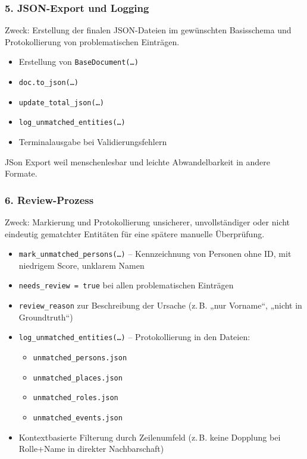 \documentclass[12pt, a4paper, ngerman, bidi=default]{article}
\begin{document}
\subsubsection*{5. JSON-Export und Logging}
Zweck: Erstellung der finalen JSON-Dateien im gewünschten Basisschema und Protokollierung von problematischen Einträgen.
\begin{itemize}
\item Erstellung von \texttt{BaseDocument(\dots)}
\item \texttt{doc.to\_json(\dots)}
\item \texttt{update\_total\_json(\dots)}
\item \texttt{log\_unmatched\_entities(\dots)}
\item Terminalausgabe bei Validierungsfehlern
\end{itemize}

JSon Export weil menschenlesbar und leichte Abwandelbarkeit in andere Formate.

\subsubsection*{6. Review-Prozess}
Zweck: Markierung und Protokollierung unsicherer, unvollständiger oder nicht eindeutig gematchter Entitäten für eine spätere manuelle Überprüfung.

\begin{itemize}
\item \texttt{mark\_unmatched\_persons(\dots)} – Kennzeichnung von Personen ohne ID, mit niedrigem Score, unklarem Namen
\item \texttt{needs\_review = true} bei allen problematischen Einträgen
\item \texttt{review\_reason} zur Beschreibung der Ursache (z.\,B. „nur Vorname“, „nicht in Groundtruth“)
\item \texttt{log\_unmatched\_entities(\dots)} – Protokollierung in den Dateien:
  \begin{itemize}
  \item \texttt{unmatched\_persons.json}
  \item \texttt{unmatched\_places.json}
  \item \texttt{unmatched\_roles.json}
  \item \texttt{unmatched\_events.json}
  \end{itemize}
\item Kontextbasierte Filterung durch Zeilenumfeld (z.\,B. keine Dopplung bei Rolle+Name in direkter Nachbarschaft)
\end{itemize}
\end{document}
